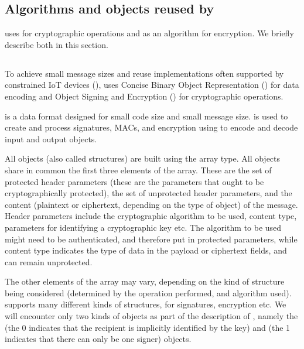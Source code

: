 {\subsection{Algorithms and objects reused by \mEdhoc{}}
\mEdhoc{} uses \mCose{} for cryptographic operations and \mAead{} as an algorithm for encryption. We briefly describe both in this section.

\subsection{\mCose}
To achieve small message sizes and reuse implementations often supported by constrained IoT devices (\mcneed), \mEdhoc{} uses Concise Binary Object Representation (\mCbor) for data encoding and \mCbor{} Object Signing and Encryption (\mCose) for cryptographic operations. 


\mCbor{} is a data format designed for small code size and small message size. \mCose{} is used to create and process signatures, MACs, and encryption using \mCbor{} to encode and decode input and output objects.

All \mCose{} objects (also called structures) are built using the \mCbor{} array type. All objects share in common the first three elements of the array. These are the set of protected header parameters (these are the parameters that ought to be cryptographically protected), the set of unprotected header parameters, and the content (plaintext or ciphertext, depending on the type of \mCose{} object) of the message. Header parameters include the cryptographic algorithm to be used, content type, parameters for identifying a cryptographic key etc. The algorithm to be used might need to be authenticated, and therefore put in protected parameters, while content type indicates the type of data in the payload or ciphertext fields, and can remain unprotected.

The other elements of the \mCbor{} array may vary, depending on the kind of \mCose{} structure being considered (determined by the operation performed, and algorithm used). \mCose{} supports many different kinds of structures, for signatures, encryption etc. We will encounter only two kinds of \mCose{} objects as part of the description of \mEdhoc, namely the \mCoseEncrypt{} (the 0 indicates that the recipient is implicitly identified by the key) and \mCoseSign{} (the 1 indicates that there can only be one signer) objects.

}
